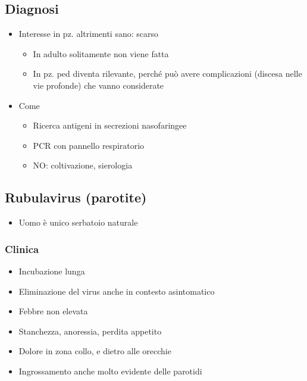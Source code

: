 \documentclass[italian,]{article}
\providecommand{\tightlist}{%
  \setlength{\itemsep}{0pt}\setlength{\parskip}{0pt}}
\newcommand{\asidefigure}[2]{\marginpar{\phantom{Img:}\newline\texttt{[image: \#1]}\\\footnotesize\emph{#2}}}
\begin{document}
\hypertarget{diagnosi-13}{%
\subsection{Diagnosi}\label{diagnosi-13}}

\begin{itemize}
\tightlist
\item
  Interesse in pz. altrimenti sano: scarso

  \begin{itemize}
  \tightlist
  \item
    In adulto solitamente non viene fatta
  \item
    In pz. ped diventa rilevante, perché può avere complicazioni
    (discesa nelle vie profonde) che vanno considerate
  \end{itemize}
\item
  Come

  \begin{itemize}
  \tightlist
  \item
    Ricerca antigeni in secrezioni nasofaringee
  \item
    PCR con pannello respiratorio
  \item
    NO: coltivazione, sierologia
  \end{itemize}
\end{itemize}

\hypertarget{rubulavirus-parotite}{%
\subsection{Rubulavirus (parotite)}\label{rubulavirus-parotite}}

\begin{itemize}
\tightlist
\item
  Uomo è unico serbatoio naturale
\end{itemize}

\hypertarget{clinica}{%
\subsubsection{Clinica}\label{clinica}}

\begin{itemize}
\tightlist
\item
  Incubazione lunga
\item
  Eliminazione del virus anche in contesto asintomatico
\item
  Febbre non elevata
\item
  Stanchezza, anoressia, perdita appetito
\item
  Dolore in zona collo, e dietro alle orecchie
  \asidefigure{img/parotite.png}{}
\item
  Ingrossamento anche molto evidente delle parotidi
\end{itemize}
\end{document}
